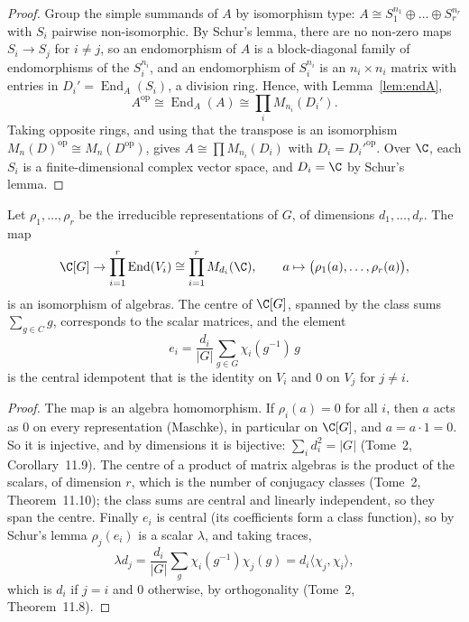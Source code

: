 \begin{proof}
Group the simple summands of $A$ by isomorphism type: $A\cong S_1^{n_1}\oplus\dots\oplus S_r^{n_r}$ with $S_i$ pairwise non-isomorphic. By Schur's lemma, there are no non-zero maps $S_i\to S_j$ for $i\ne j$, so an endomorphism of
$A$ is a block-diagonal family of endomorphisms of the $S_i^{n_i}$, and an endomorphism of $S_i^{n_i}$ is an $n_i\times n_i$ matrix with entries in $D_i'=\operatorname{End}_A(S_i)$, a division ring. Hence, with Lemma~\ref{lem:endA},
\[
A^{\mathrm{op}}\cong\operatorname{End}_A(A)\cong\prod_iM_{n_i}(D_i').
\]
Taking opposite rings, and using that the transpose is an isomorphism $M_n(D)^{\mathrm{op}}\cong M_n(D^{\mathrm{op}})$, gives $A\cong\prod M_{n_i}(D_i)$ with $D_i=D_i'^{\mathrm{op}}$. Over $\C$, each $S_i$ is a finite-dimensional
complex vector space, and $D_i=\C$ by Schur's lemma.
\end{proof}

\begin{corollary}\label{cor:wedderburnCG}
Let $\rho_1,\dots,\rho_r$ be the irreducible representations of $G$, of dimensions $d_1,\dots,d_r$. The map
\[
\C[G]\to\prod_{i=1}^r\operatorname{End}(V_i)\cong\prod_{i=1}^rM_{d_i}(\C),\qquad a\mapsto\bigl(\rho_1(a),\dots,\rho_r(a)\bigr),
\]
is an isomorphism of algebras. The centre of $\C[G]$, spanned by the class sums $\sum_{g\in C}g$, corresponds to the scalar matrices, and the element
\[
e_i=\frac{d_i}{|G|}\sum_{g\in G}\chi_i(g^{-1})\,g
\]
is the central idempotent that is the identity on $V_i$ and $0$ on $V_j$ for $j\ne i$.
\end{corollary}

\begin{proof}
The map is an algebra homomorphism. If $\rho_i(a)=0$ for all $i$, then $a$ acts as $0$ on every representation (Maschke), in particular on $\C[G]$, and $a=a\cdot1=0$. So it is injective, and by dimensions it is bijective:
$\sum_id_i^2=|G|$ (Tome~2, Corollary~11.9). The centre of a product of matrix algebras is the product of the scalars, of dimension $r$, which is the number of conjugacy classes (Tome~2, Theorem~11.10); the class sums are central
and linearly independent, so they span the centre. Finally $e_i$ is central (its coefficients form a class function), so by Schur's lemma $\rho_j(e_i)$ is a scalar $\lambda$, and taking traces,
\[
\lambda d_j=\frac{d_i}{|G|}\sum_g\chi_i(g^{-1})\chi_j(g)=d_i\langle\chi_j,\chi_i\rangle,
\]
which is $d_i$ if $j=i$ and $0$ otherwise, by orthogonality (Tome~2, Theorem~11.8).
\end{proof}

